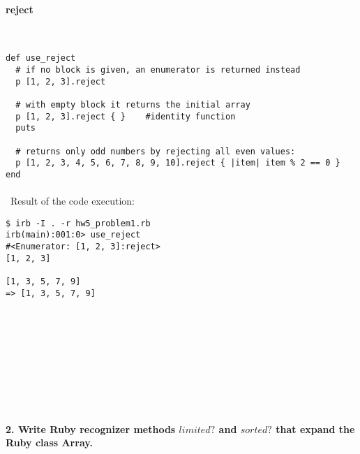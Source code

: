 \documentclass{article}
\begin{document}
\paragraph{ reject}\

\begin{verbatim}
def use_reject
  # if no block is given, an enumerator is returned instead
  p [1, 2, 3].reject

  # with empty block it returns the initial array
  p [1, 2, 3].reject { }    #identity function
  puts

  # returns only odd numbers by rejecting all even values:
  p [1, 2, 3, 4, 5, 6, 7, 8, 9, 10].reject { |item| item % 2 == 0 }
end
\end{verbatim}


\paragraph{}\
Result of the code execution:

\begin{verbatim} 
$ irb -I . -r hw5_problem1.rb
irb(main):001:0> use_reject
#<Enumerator: [1, 2, 3]:reject>
[1, 2, 3]

[1, 3, 5, 7, 9]
=> [1, 3, 5, 7, 9]
\end{verbatim}

\paragraph{}\



\paragraph{}\
\paragraph{}\
\paragraph{}\


	\paragraph{2. Write Ruby recognizer methods \(limited?\) and \(sorted?\) that expand the Ruby class Array.}\ \newline
	
\end{document}

